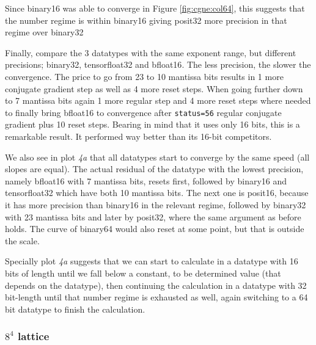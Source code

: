 \documentclass{article}
\theoremstyle{plain} %
\theoremstyle{convention} %
\theoremstyle{remark} %
\def\code#1{\texttt{#1}}
\numberwithin{equation}{section}
\begin{document}
Since \gls{binary16} was able to converge in Figure \ref{fig:cgne:col64}, this suggests that the number regime is within \gls{binary16} giving \gls{posit32} more precision in that regime over \gls{binary32}

Finally, compare the \num{3} datatypes with the same exponent range, but different precisions; \gls{binary32}, \gls{tensorfloat32} and \gls{bfloat16}. The less precision, the slower the convergence. The price to go from \num{23} to \num{10} mantissa bits results in \num{1} more conjugate gradient step as well as \num{4} more reset steps. When going further down to \num{7} mantissa bits again \num{1} more regular step and \num{4} more reset steps where needed to finally bring \gls{bfloat16} to convergence after \code{status=56} regular conjugate gradient plus \num{10} reset steps. Bearing in mind that it uses only \num{16} bits, this is a remarkable result. It performed way better than its \num{16}-bit competitors.

We also see in plot \textit{4a} that all datatypes start to converge by the same speed (all slopes are equal). The actual residual of the datatype with the lowest precision, namely \gls{bfloat16} with \num{7} mantissa bits, resets first, followed by \gls{binary16} and \gls{tensorfloat32} which have both \num{10} mantissa bits. The next one is \gls{posit16}, because it has more precision than \gls{binary16} in the relevant regime, followed by \gls{binary32} with \num{23} mantissa bits and later by \gls{posit32}, where the same argument as before holds. The curve of \gls{binary64} would also reset at some point, but that is outside the scale.

Specially plot \textit{4a} suggests that we can start to calculate in a datatype with \num{16} bits of length until we fall below a constant, to be determined value (that depends on the datatype), then continuing the calculation in a datatype with \num{32} bit-length until that number regime is exhausted as well, again switching to a \num{64} bit datatype to finish the calculation.

\subsubsection{$8^4$ lattice}
\end{document}
